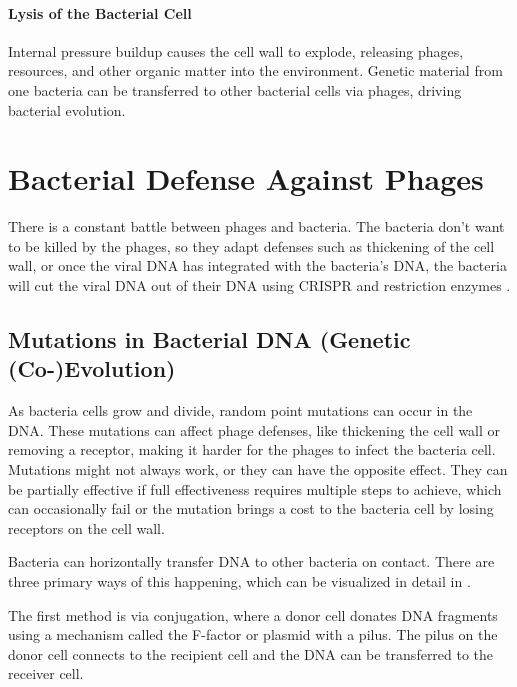\paragraph{Lysis of the Bacterial Cell}
Internal pressure buildup causes the cell wall to explode, releasing phages, resources, and other organic matter into the environment. 
Genetic material from one bacteria can be transferred to other bacterial cells via phages, driving bacterial evolution.  %


\section{Bacterial Defense Against Phages} 
There is a constant battle between phages and bacteria. 
The bacteria don't want to be killed by the phages, so they adapt defenses such as thickening of the cell wall, or once the viral DNA has integrated with the bacteria's DNA, the bacteria will cut the viral DNA out of their DNA using CRISPR and restriction enzymes \cite{iglerPhenotypicFluxRole2022}. 

\subsection{Mutations in Bacterial DNA (Genetic (Co-)Evolution)}
As bacteria cells grow and divide, random point mutations can occur in the DNA. 
These mutations can affect phage defenses, like thickening the cell wall or removing a receptor, making it harder for the phages to infect the bacteria cell. 
Mutations might not always work, or they can have the opposite effect. 
They can be partially effective if full effectiveness requires multiple steps to achieve, which can occasionally fail \cite{lenskiTWOSTEPRESISTANCEESCHERICHIA1984} or the mutation brings a cost to the bacteria cell by losing receptors on the cell wall. \newline

Bacteria can horizontally transfer DNA to other bacteria on contact. 
There are three primary ways of this happening, which can be visualized in detail in . 

The first method is via conjugation, where a donor cell donates DNA fragments using a mechanism called the F-factor or plasmid with a pilus. 
The pilus on the donor cell connects to the recipient cell and the DNA can be transferred to the receiver cell. 

